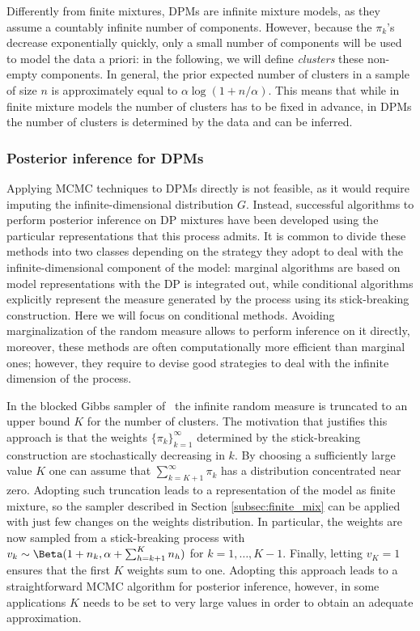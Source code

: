 Differently from finite mixtures, DPMs are infinite mixture models, as they assume a countably infinite number of components. 
However, because the $\pi_k$'s decrease exponentially quickly, only a small number of components will be used to model the
data a priori: in the following, we will define \textit{clusters} these non-empty components. In general, the prior expected number of clusters in a sample of size $n$ is approximately equal to $\alpha \log(1 + n/\alpha)$.
This means that while in finite mixture models the number of clusters has to be fixed in advance, in DPMs the number of clusters is determined by the data and can be inferred.

\subsubsection*{Posterior inference for DPMs}
Applying MCMC techniques to DPMs directly is not feasible, as it would require imputing the infinite-dimensional distribution $G$. Instead, successful algorithms to perform posterior inference on DP mixtures have been developed using the particular representations that this process admits. 
It is common to divide these methods into two classes depending on the strategy they adopt to deal with the infinite-dimensional component of the model: marginal algorithms are based on model representations with the DP is integrated out, while conditional algorithms explicitly represent the measure generated by the process using its stick-breaking construction.
Here we will focus on conditional methods. Avoiding marginalization of the random measure allows to perform inference on it directly, moreover, these methods are often computationally more efficient than marginal ones; however, they require to devise good strategies to deal with the infinite dimension of the process.

In the blocked Gibbs sampler of~\citet{ishwaran2001} the infinite random measure is truncated to an upper bound $K$ for the number of clusters. The motivation that justifies this approach is that the weights $\{\pi_k\}_{k=1}^{\infty}$ determined by the stick-breaking construction are stochastically decreasing in $k$. By choosing a sufficiently large value $K$ one can assume that $\sum_{k=K+1}^{\infty} \pi_k$ has a distribution concentrated near zero.
Adopting such truncation leads to a representation of the model as finite mixture, so the sampler described in Section \ref{subsec:finite_mix} can be applied with just few changes on the weights distribution. In particular, the weights are now sampled from a stick-breaking process with $v_k \sim \Beta(1+n_k, \alpha + \sum_{h=k+1}^K n_h)$ for $k = 1,\dots,K-1$. Finally, letting $v_K = 1$ ensures that the first $K$ weights sum to one. Adopting this approach leads to a straightforward MCMC algorithm for posterior inference, however, in some applications $K$ needs to be set to very large values in order to obtain an adequate approximation.

